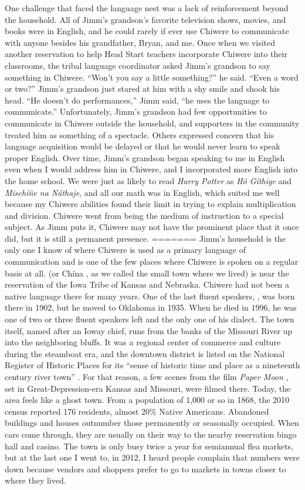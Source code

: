 \documentclass[output=paper]{LSP/langsci}
\begin{document}
One challenge that faced the language nest was a lack of reinforcement beyond the household. All of Jimm's grandson's favorite television shows, movies, and books were in English, and he could rarely if ever use Chiwere to communicate with anyone besides his grandfather, Bryan, and me. Once when we visited another reservation to help Head Start teachers incorporate Chiwere into their classrooms, the tribal language coordinator asked Jimm's grandson to say something in Chiwere. ``Won't you say a little something?'' he said. ``Even a word or two?'' Jimm's grandson just stared at him with a shy smile and shook his head. ``He doesn't do performances,'' Jimm said, ``he uses the language to communicate.'' Unfortunately, Jimm's grandson had few opportunities to communicate in Chiwere outside the household, and supporters in the community treated him as something of a spectacle. Others expressed concern that his language acquisition would be delayed or that he would never learn to speak proper English. Over time, Jimm's grandson began speaking to me in English even when I would address him in Chiwere, and I incorporated more English into the home school. We were just as likely to read \emph{Harry Potter} as \emph{Hó Gíthige} and \emph{Mischíñe na Náthaje}, and all our math was in English, which suited me well because my Chiwere abilities found their limit in trying to explain multiplication and division. Chiwere went from being the medium of instruction to a special subject. As Jimm puts it, Chiwere may not have the prominent place that it once did, but it is still a permanent presence.
=======
Jimm's household is the only one I know of where Chiwere is used as a primary language of communication and is one of the few places where Chiwere is spoken on a regular basis at all.  (or Ch\'ina , as we called the small town where we lived) is near the reservation of the Iowa Tribe of Kansas and Nebraska. Chiwere had not been a native language there for many years. One of the last fluent speakers, , was born there in 1902, but he moved to Oklahoma in 1935. When he died in 1996, he was one of two or three fluent speakers left and the only one of his dialect. The town itself, named after an Ioway chief, runs from the banks of the Missouri River up into the neighboring bluffs. It was a regional center of commerce and culture during the steamboat era, and the downtown district is listed on the National Register of Historic Places for its ``sense of historic time and place as a nineteenth century river town'' \citep[1]{Wolfenbarger1996}. For that reason, a few scenes from the film \emph{Paper Moon} \citep{Bogdanovich1973}, set in Great-Depression-era Kansas and Missouri, were filmed there. Today, the area feels like a ghost town. From a population of 1,000 or so in 1868, the 2010 census reported 176 residents, almost 20\% Native Americans. Abandoned buildings and houses outnumber those permanently or seasonally occupied. When cars come through, they are usually on their way to the nearby reservation bingo hall and casino. The town is only busy twice a year for semiannual flea markets, but at the last one I went to, in 2012, I heard people complain that numbers were down because vendors and shoppers prefer to go to markets in towns closer to where they lived.
\end{document}
